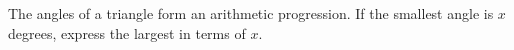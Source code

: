 The angles of a triangle form an arithmetic progression. If the smallest angle is $x$ degrees, express the largest in terms of $x$.
